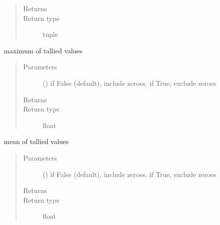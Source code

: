 \documentclass[letterpaper,10pt,english]{sphinxmanual}
\begin{document}
\begin{fulllineitems}
\begin{fulllineitems}
\begin{quote}
\begin{description}
\item[{Returns}] \leavevmode
{}

\item[{Return type}] \leavevmode
tuple

\end{description}\end{quote}

\end{fulllineitems}


\begin{fulllineitems}
\label{\detokenize{Reference:salabim.Monitor.maximum}}
maximum of tallied values
\begin{quote}\begin{description}
\item[{Parameters}] \leavevmode
{} () \textendash{} if False (default), include zeroes. if True, exclude zeroes

\item[{Returns}] \leavevmode
{}

\item[{Return type}] \leavevmode
float

\end{description}\end{quote}

\end{fulllineitems}


\begin{fulllineitems}
\label{\detokenize{Reference:salabim.Monitor.mean}}
mean of tallied values
\begin{quote}\begin{description}
\item[{Parameters}] \leavevmode
{} () \textendash{} if False (default), include zeroes. if True, exclude zeroes

\item[{Returns}] \leavevmode
{}

\item[{Return type}] \leavevmode
float


\end{description}
\end{quote}
\end{fulllineitems}
\end{fulllineitems}
\end{document}
